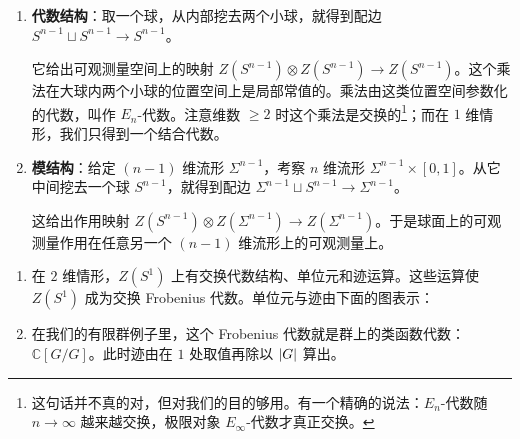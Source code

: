 \begin{enumerate}[label=(\arabic*),leftmargin=2.2em]
\item \textbf{代数结构}：取一个球，从内部挖去两个小球，就得到配边 $S^{n-1}\sqcup S^{n-1}\to S^{n-1}$。


它给出可观测量空间上的映射 $Z(S^{n-1})\otimes Z(S^{n-1})\to Z(S^{n-1})$。这个乘法在大球内两个小球的位置空间上是局部常值的。乘法由这类位置空间参数化的代数，叫作 $E_n$-代数。注意维数 $\ge 2$ 时这个乘法是交换的\footnote{这句话并不真的对，但对我们的目的够用。有一个精确的说法：$E_n$-代数随 $n\to\infty$ 越来越交换，极限对象 $E_\infty$-代数才真正交换。}；而在 $1$ 维情形，我们只得到一个结合代数。
\item \textbf{模结构}：给定 $(n-1)$ 维流形 $\Sigma^{n-1}$，考察 $n$ 维流形 $\Sigma^{n-1}\times[0,1]$。从它中间挖去一个球 $S^{n-1}$，就得到配边 $\Sigma^{n-1}\sqcup S^{n-1}\to\Sigma^{n-1}$。


这给出作用映射 $Z(S^{n-1})\otimes Z(\Sigma^{n-1})\to Z(\Sigma^{n-1})$。于是球面上的可观测量作用在任意另一个 $(n-1)$ 维流形上的可观测量上。
\end{enumerate}

\begin{exmp}
\begin{enumerate}[label=(\roman*),leftmargin=2.2em]
\item 在 $2$ 维情形，$Z(S^1)$ 上有交换代数结构、单位元和迹运算。这些运算使 $Z(S^1)$ 成为交换 Frobenius 代数。单位元与迹由下面的图表示：


\item 在我们的有限群例子里，这个 Frobenius 代数就是群上的类函数代数：$\mathbb C[G/G]$。此时迹由在 $1$ 处取值再除以 $\lvert G \rvert$ 算出。
\end{enumerate}
\end{exmp}
